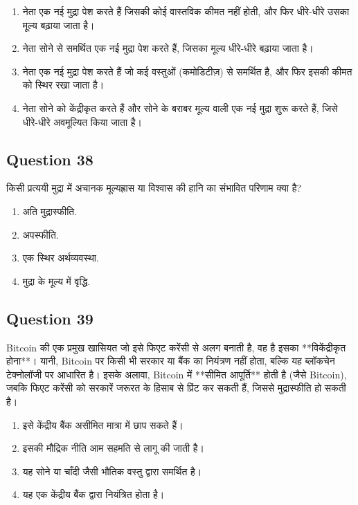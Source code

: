\documentclass[12pt,a4paper]{article}
\begin{document}
\begin{enumerate}[label=\Alph*., leftmargin=*]
\item नेता एक नई मुद्रा पेश करते हैं जिसकी कोई वास्तविक कीमत नहीं होती, और फिर धीरे-धीरे उसका मूल्य बढ़ाया जाता है।
\item नेता सोने से समर्थित एक नई मुद्रा पेश करते हैं, जिसका मूल्य धीरे-धीरे बढ़ाया जाता है।
\item नेता एक नई मुद्रा पेश करते हैं जो कई वस्तुओं (कमोडिटीज़) से समर्थित है, और फिर इसकी कीमत को स्थिर रखा जाता है।
\item नेता सोने को केंद्रीकृत करते हैं और सोने के बराबर मूल्य वाली एक नई मुद्रा शुरू करते हैं, जिसे धीरे-धीरे अवमूल्यित किया जाता है।
\end{enumerate}

\bigskip


\subsection*{Question 38}
किसी प्रत्ययी मुद्रा में अचानक मूल्यह्रास या विश्वास की हानि का संभावित परिणाम क्या है?

\begin{enumerate}[label=\Alph*., leftmargin=*]
\item अति मुद्रास्फीति.
\item अपस्फीति.
\item एक स्थिर अर्थव्यवस्था.
\item मुद्रा के मूल्य में वृद्धि.
\end{enumerate}

\bigskip


\subsection*{Question 39}
Bitcoin की एक प्रमुख खासियत जो इसे फिएट करेंसी से अलग बनाती है, वह है इसका **विकेंद्रीकृत होना**। यानी, Bitcoin पर किसी भी सरकार या बैंक का नियंत्रण नहीं होता, बल्कि यह ब्लॉकचेन टेक्नोलॉजी पर आधारित है। इसके अलावा, Bitcoin में **सीमित आपूर्ति** होती है (जैसे Bitcoin), जबकि फिएट करेंसी को सरकारें जरूरत के हिसाब से प्रिंट कर सकती हैं, जिससे मुद्रास्फीति हो सकती है।

\begin{enumerate}[label=\Alph*., leftmargin=*]
\item इसे केंद्रीय बैंक असीमित मात्रा में छाप सकते हैं।
\item इसकी मौद्रिक नीति आम सहमति से लागू की जाती है।
\item यह सोने या चाँदी जैसी भौतिक वस्तु द्वारा समर्थित है।
\item यह एक केंद्रीय बैंक द्वारा नियंत्रित होता है।
\end{enumerate}
\end{document}
